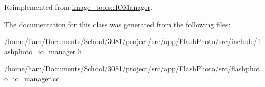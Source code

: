 Reimplemented from \hyperlink{classimage__tools_1_1IOManager_a5038100a2a640a3343c4715101eec120}{image\+\_\+tools\+::\+I\+O\+Manager}.



The documentation for this class was generated from the following files\+:\begin{DoxyCompactItemize}
\item 
/home/liam/\+Documents/\+School/3081/project/src/app/\+Flash\+Photo/src/include/flashphoto\+\_\+io\+\_\+manager.\+h\item 
/home/liam/\+Documents/\+School/3081/project/src/app/\+Flash\+Photo/src/flashphoto\+\_\+io\+\_\+manager.\+cc\end{DoxyCompactItemize}
